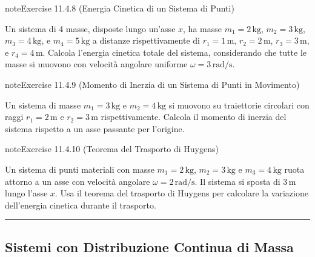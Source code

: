 \documentclass[letterpaper,10pt,italian]{jupyterBook}
\begin{document}
\begin{sphinxadmonition}{note}{Exercise 11.4.8 (Energia Cinetica di un Sistema di Punti)}



\sphinxAtStartPar
Un sistema di 4 masse, disposte lungo un’asse \(x\), ha masse \(m_1 = 2 \, \text{kg}\), \(m_2 = 3 \, \text{kg}\), \(m_3 = 4 \, \text{kg}\), e \(m_4 = 5 \, \text{kg}\) a distanze rispettivamente di \(r_1 = 1 \, \text{m}\), \(r_2 = 2 \, \text{m}\), \(r_3 = 3 \, \text{m}\), e \(r_4 = 4 \, \text{m}\). Calcola l’energia cinetica totale del sistema, considerando che tutte le masse si muovono con velocità angolare uniforme \(\omega = 3 \, \text{rad/s}\).
\end{sphinxadmonition}
 \label{exercise:ch/mechanics/inertia-problems-exercise-8}

\begin{sphinxadmonition}{note}{Exercise 11.4.9 (Momento di Inerzia di un Sistema di Punti in Movimento)}



\sphinxAtStartPar
Un sistema di masse \(m_1 = 3 \, \text{kg}\) e \(m_2 = 4 \, \text{kg}\) si muovono su traiettorie circolari con raggi \(r_1 = 2 \, \text{m}\) e \(r_2 = 3 \, \text{m}\) rispettivamente. Calcola il momento di inerzia del sistema rispetto a un asse passante per l’origine.
\end{sphinxadmonition}
 \label{exercise:ch/mechanics/inertia-problems-exercise-9}

\begin{sphinxadmonition}{note}{Exercise 11.4.10 (Teorema del Trasporto di Huygens)}



\sphinxAtStartPar
Un sistema di punti materiali con masse \(m_1 = 2 \, \text{kg}\), \(m_2 = 3 \, \text{kg}\) e \(m_3 = 4 \, \text{kg}\) ruota attorno a un asse con velocità angolare \(\omega = 2 \, \text{rad/s}\). Il sistema si sposta di \(3 \, \text{m}\) lungo l’asse \(x\). Usa il teorema del trasporto di Huygens per calcolare la variazione dell’energia cinetica durante il trasporto.
\end{sphinxadmonition}


\bigskip\hrule\bigskip



\subsection{Sistemi con Distribuzione Continua di Massa}
\label{\detokenize{ch/mechanics/inertia-problems:sistemi-con-distribuzione-continua-di-massa}} \label{exercise:ch/mechanics/inertia-problems-exercise-10}
\end{document}
